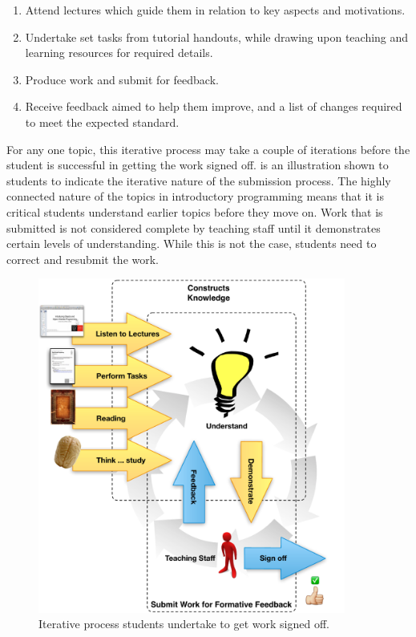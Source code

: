 \begin{enumerate}
	\item Attend lectures which guide them in relation to key aspects and motivations.
	\item Undertake set tasks from tutorial handouts, while drawing upon teaching and learning resources for required details.
	\item Produce work and submit for feedback.
	\item Receive feedback aimed to help them improve, and a list of changes required to meet the expected standard.
\end{enumerate}

For any one topic, this iterative process may take a couple of iterations before the student is successful in getting the work signed off.  is an illustration shown to students to indicate the iterative nature of the submission process. The highly connected nature of the topics in introductory programming means that it is critical students understand earlier topics before they move on. Work that is submitted is not considered complete by teaching staff until it demonstrates certain levels of understanding. While this is not the case, students need to correct and resubmit the work.

\begin{figure}[p]
	\centering
	\includegraphics[width=0.9\textwidth]{ConstructKnowledge}
	\caption{Iterative process students undertake to get work signed off.}
	\label{fig:construct_knowledge}
\end{figure}

